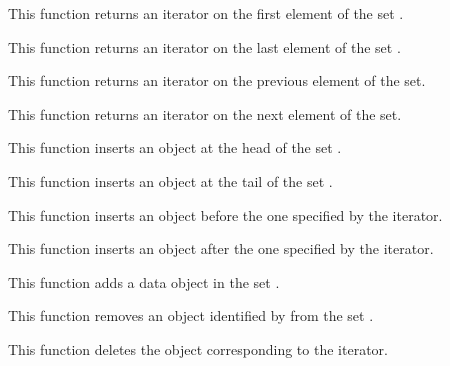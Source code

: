 	 {
	   This function returns an iterator on the first element
	   of the set .
	 }

	 {
	   This function returns an iterator on the last element of
	   the set .
	 }

	 {
	   This function returns an iterator on the previous element
	   of the set.
	 }

	 {
	   This function returns an iterator on the next element
	   of the set.
	 }

	 {
	   This function inserts an object at the head of the set
	   .
	 }

	 {
	   This function inserts an object at the tail of the set
	   .
	 }

	 {
	   This function inserts an object before the one specified
	   by the iterator.
	 }

	 {
	   This function inserts an object after the one specified
	   by the iterator.
	 }

	 {
	   This function adds a data object in the set .
	 }

	 {
	   This function removes an object identified by 
	   from the set .
	 }

	 {
	   This function deletes the object corresponding to the iterator.
	 }

